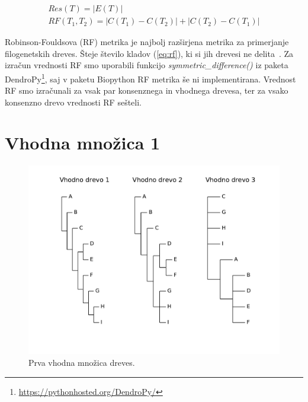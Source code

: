 \documentclass[a4paper, 12pt]{book}
\begin{document}
\begin{align}
	Res(T) = \left|E(T)\right| \label{eq:res} ~~~~~~~~~~~~~~~~~~~~~ \\
	RF(T_1, T_2) = \left|C(T_1) - C(T_2)\right| + \left|C(T_2) - C(T_1)\right|  \label{eq:rf}
\end{align}

Robinson-Fouldsova (RF) metrika je najbolj razširjena metrika za primerjanje filogenetskih dreves. Šteje število kladov (\ref{eq:rf}), ki si jih drevesi ne delita~\cite{rf}. Za izračun vrednosti RF smo uporabili funkcijo {\it symmetric\_difference()} iz paketa DendroPy\footnote{\url{https://pythonhosted.org/DendroPy/}}, saj v paketu Biopython RF metrika še ni implementirana. Vrednost RF smo izračunali za vsak par konsenznega in vhodnega drevesa, ter za vsako konsenzno drevo vrednosti RF sešteli.

\section{Vhodna množica 1}
\begin{figure}[h!]
	\begin{center}
		\includegraphics[scale=0.45, clip=true, trim=1cm 2cm 1cm 0]{gfx/eval_input.pdf}
	\end{center}
	\caption{Prva vhodna množica dreves.}
	\label{img-eval-input}
\end{figure}
\end{document}
